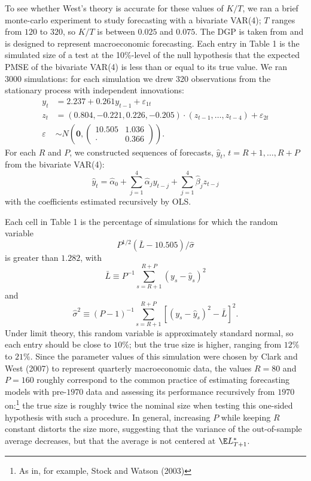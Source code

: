 \documentclass[11pt]{article} \def\baselinestretch{1.08}
\newcommand{\pp}[1]{#1} \newcommand{\intro}[1]{#1}
\begin{document}
To see whether West's theory is accurate for these values of $K/T$, we
ran a brief monte-carlo experiment to study forecasting with a
bivariate VAR(4); $T$
ranges from $120$ to $320$, so $K/T$ is between $0.025$ and $0.075$.
\pp{The DGP is taken from  and is designed to
  represent macroeconomic forecasting.} Each entry in Table 1
  is the simulated size of a test at the 10\%-level of
  the null hypothesis that the expected PMSE of the bivariate VAR(4) is
  less than or equal to its true value.  We ran 3000 simulations: for
  each simulation we drew 320 observations from the stationary process
  with independent innovations:
\begin{align*}
  y_t &= 2.237 + 0.261 y_{t-1} + \varepsilon_{1t} \\
  z_t &= (0.804, - 0.221, 0.226, - 0.205) \cdot (z_{t-1},\dotsc, z_{t-4})
  + \varepsilon_{2t} \\
  \varepsilon &\sim N\left(\boldsymbol{0}, \begin{pmatrix}
      10.505 & 1.036 \\ \cdot & 0.366
      \end{pmatrix}\right).
\end{align*}
For each $R$ and $P$, we constructed sequences of forecasts, $\hat
y_t$, $t = R+1,\dotsc, R+P$ from the bivariate VAR(4):
\begin{equation*}
  \hat y_t = \hat \alpha_0 + \sum_{j=1}^4 \hat \alpha_j y_{t-j} 
  + \sum_{j=1}^4 \hat \beta_j z_{t-j}
\end{equation*}
with the coefficients estimated recursively by OLS. 

Each cell in Table 1 is the percentage of simulations for
which the random variable
\begin{equation} \label{eq_mc1stat}
P^{1/2} (\bar L - 10.505) / \hat \sigma
\end{equation}
is greater than $1.282$, with 
\[
\bar L \equiv P^{-1} \sum_{s=R+1}^{R+P} (y_s -\hat y_s)^2
\] 
and 
\[
\hat \sigma^2 \equiv (P-1)^{-1} \sum_{s=R+1}^{R+P} [(y_s -
\hat y_s)^2 - \bar L]^2.
\]
\pp{Under  limit theory, this random variable is
  approximately standard normal, so each entry should be close to
  $10\%$; but the true size is higher, ranging from $12\%$ to $21\%$.} 
Since the parameter values of this simulation were chosen by Clark and West
(2007) to represent quarterly macroeconomic data, the values $R = 80$
and $P = 160$ roughly correspond to the common practice of estimating
forecasting models with pre-$1970$ data and assessing its performance
recursively from $1970$ on:\footnote{As in, for example, Stock and
  Watson (2003)} the true size is roughly twice the nominal size when
  testing this one-sided hypothesis with
such a procedure.  In general, increasing $P$ while keeping $R$
constant distorts the size more, suggesting that the variance of the
out-of-sample average decreases, but that the average is not centered at
$\E \ft{T+1}{}$.
\end{document}
